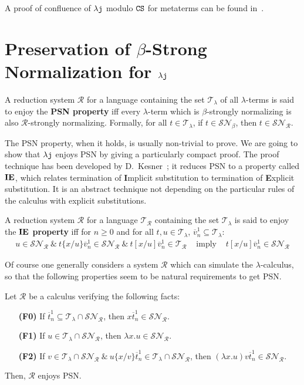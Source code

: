 \documentclass{LMCS}
\renewcommand{\>}{\rightarrow}
\def\lam{\lambda}
\newcommand{\isubs}[1]{ \{ #1  \} }
\newcommand{\SN}[1]{\mathcal{SN}_{#1}}
\newcommand{\R}{\mathcal{R}}
\newcommand{\dis}{{\tt j}}
\newcommand{\ldis}{\lam{\dis}}
\newcommand{\lj}{\lam{\dis}}
\newcommand{\CS}{{\tt CS}}
\newcommand{\terms}{\mathcal{T}}
\newcommand{\termslambda}{\terms_{\lam}}
\newcommand{\deft}[1]{{\bf #1}}
\newcommand{\iep}{{\bf IE}}
\newcommand{\ovl}[3]{\overline{#1}^{#2}_{#3}}
\begin{document}
A proof of confluence of $\ldis$ modulo $\CS$ for metaterms can be found in~\cite{Renaudth}.

\section{Preservation of $\beta$-Strong Normalization for $\ldis$}
\label{s:lj-psn}

A reduction system $\R$ for a language containing the set
$\termslambda$ of all $\lam$-terms is said to enjoy the \deft{PSN
  property} iff every $\lam$-term which is
$\beta$-strongly normalizing is also
$\R$-strongly normalizing. Formally, for all
$t \in \termslambda$, if $t \in \SN{\beta}$, then $t \in \SN{\R}$. 

The PSN property, when it holds, is usually non-trivial to prove. We are
going to show that $\lj$ enjoys PSN by giving a particularly compact proof. The proof
  technique has been developed by D.~Kesner~\cite{Kes09}; it reduces PSN to a
  property called $\iep$, which relates termination of
\deft{I}mplicit substitution to termination of \deft{E}xplicit
substitution. It is an abstract technique not
depending on the particular rules of the calculus with
explicit substitutions.

A reduction system $\R$ for a language $\terms_{\R}$ containing the
set $\termslambda$ is said to enjoy the \deft{$\iep$ property} iff for
$n\geq 0$ and for all $t, u \in \termslambda$, $\ovl{v}{1}{n}
  \subseteq \termslambda$:
\[\begin{array}{ccc}
u \in    \SN{\R}\ \&\ t\isubs{x/u} \ovl{v}{1}{n}  \in \SN{\R}\ \&\  t[x/u] \ovl{v}{1}{n} \in \terms_{\R} &\mbox{ imply } 
&   t[x/u] \ovl{v}{1}{n}   \in \SN{\R}
   \end{array}\]

Of course one generally considers a system $\R$ which can simulate the
$\lam$-calculus,  so that the following properties seem to be natural requirements to get PSN.




\begin{thm}
\label{t:ie-implies-psn}
Let $\R$ be a calculus verifying the following facts:
\begin{enumerate}[\bf(F1)]
\item[{\bf (F0)}] \label{f:uno} If $\ovl{t}{1}{n} \subseteq\termslambda\cap\SN{\R}$, then $x \ovl{t}{1}{n}
  \in \SN{\R}$.
\item[{\bf (F1)}] \label{f:dos} If $u \in \termslambda\cap\SN{\R}$, then $\lam x. u \in    \SN{\R}$.
\item[{\bf (F2)}] \label{f:tres} If $v \in \termslambda\cap\SN{\R}\ \&\ u\isubs{x/v} \ovl{t}{1}{n} \in \termslambda\cap\SN{\R}$, then 
$(\lam x.  u) v \ovl{t}{1}{n} \in  \SN{\R}$.

\end{enumerate}
Then, $\R$ enjoys PSN. 
\end{thm}
\end{document}
